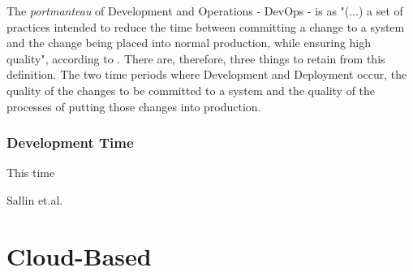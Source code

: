 The \textit{portmanteau} of Development and Operations - DevOps - is as "(...) a set of practices intended to reduce the time between committing a change to a system and the change being placed into normal production, while ensuring high quality", according to \parencite{bass_weber_zhu_2015}. There are, therefore, three things to retain from this definition. The two time periods where Development and Deployment occur, the quality of the changes to be committed to a system and the quality of the processes of putting those changes into production.

\subsubsection{Development Time}
This time 






Sallin et.al. \parencite{sallin_kropp_anslow_quilty_meier_2021}

\section{Cloud-Based}
\label{state-of-the-art:s:cloud-based}